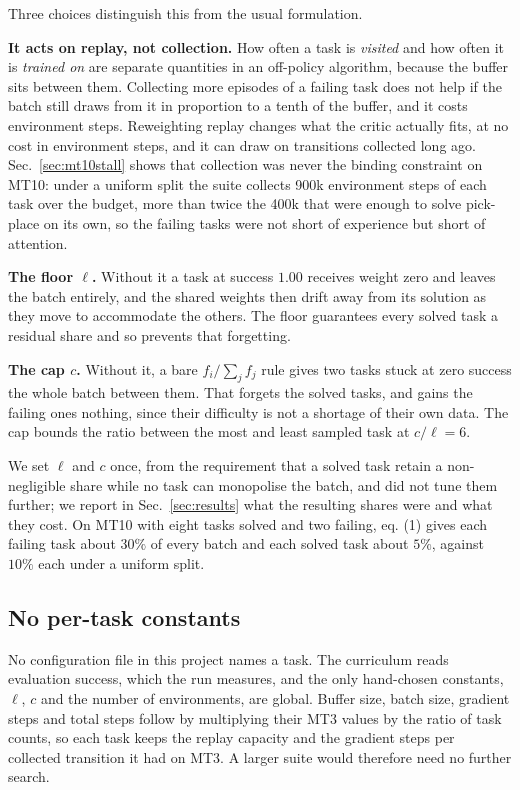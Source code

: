 \documentclass[letterpaper, 10 pt, conference]{ieeeconf}
\begin{document}
Three choices distinguish this from the usual formulation.

\textbf{It acts on replay, not collection.} How often a task is \emph{visited} and how
often it is \emph{trained on} are separate quantities in an off-policy algorithm, because the
buffer sits between them. Collecting more episodes of a failing task does not help if the
batch still draws from it in proportion to a tenth of the buffer, and it costs environment
steps. Reweighting replay changes what the critic actually fits, at no cost in environment
steps, and it can draw on transitions collected long ago. Sec.~\ref{sec:mt10stall} shows that
collection was never the binding constraint on MT10: under a uniform split the suite collects
900k environment steps of each task over the budget, more than twice the 400k that were enough
to solve pick-place on its own, so the failing tasks were not short of experience but short of
attention.

\textbf{The floor $\ell$.} Without it a task at success $1.00$ receives weight zero and
leaves the batch entirely, and the shared weights then drift away from its solution as they
move to accommodate the others. The floor guarantees every solved task a residual share and so
prevents that forgetting.

\textbf{The cap $c$.} Without it, a bare $f_i/\sum_j f_j$ rule gives two tasks stuck at
zero success the whole batch between them. That forgets the solved tasks, and gains the failing
ones nothing, since their difficulty is not a shortage of their own data. The cap bounds the
ratio between the most and least sampled task at $c/\ell = 6$.

We set $\ell$ and $c$ once, from the requirement that a solved task retain a
non-negligible share while no task can monopolise the batch, and did not tune them further; we
report in Sec.~\ref{sec:results} what the resulting shares were and what they cost. On MT10
with eight tasks solved and two failing, eq. (1) gives each failing task about $30\%$ of every
batch and each solved task about $5\%$, against $10\%$ each under a uniform split.

\subsection{No per-task constants}

No configuration file in this project names a task. The curriculum reads evaluation
success, which the run measures, and the only hand-chosen constants, $\ell$, $c$ and the number
of environments, are global. Buffer size, batch size, gradient steps and total steps follow by
multiplying their MT3 values by the ratio of task counts, so each task keeps the replay
capacity and the gradient steps per collected transition it had on MT3. A larger suite would
therefore need no further search.
\end{document}
